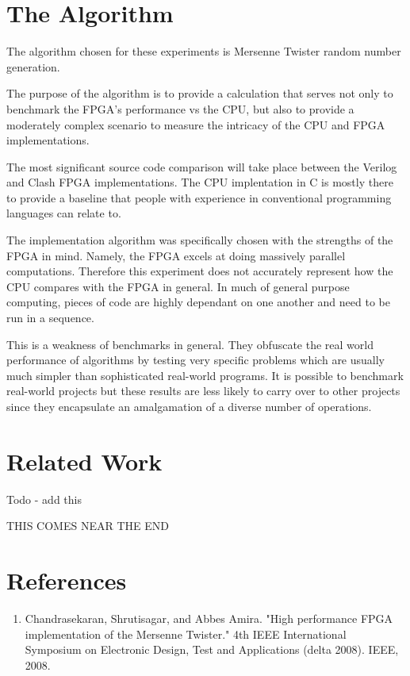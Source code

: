 \documentclass{article}
\begin{document}
\begin{multicols}{2}
    \section{The Algorithm}

    The algorithm chosen for these experiments is Mersenne Twister
    random number generation.

    The purpose of the algorithm is to provide a calculation that serves not only to benchmark
    the FPGA's performance vs the CPU, but also to provide a moderately complex
    scenario to measure the intricacy of the CPU and FPGA implementations.

    The most significant source code comparison will take place between the Verilog and
    Clash FPGA implementations. The CPU implentation in C is mostly there to provide
    a baseline that people with experience in conventional programming languages
    can relate to.

    The implementation algorithm was specifically chosen with the strengths of the FPGA
    in mind. Namely, the FPGA excels at doing massively parallel computations.
    Therefore this experiment does not accurately represent how the CPU compares
    with the FPGA in general. In much of general purpose computing, pieces of code
    are highly dependant on one another and need to be run in a sequence.

    This is a weakness of benchmarks in general. They obfuscate the real world performance
    of algorithms by testing very specific problems which are usually much simpler
    than sophisticated real-world programs. It is possible to benchmark real-world
    projects but these results are less likely to carry over to other projects since
    they encapsulate an amalgamation of a diverse number of operations.
    
    \section{Related Work}

    Todo - add this

    THIS COMES NEAR THE END

    
    \end{multicols}

    \break
    \section*{References}

    \begin{enumerate}

    \item Chandrasekaran, Shrutisagar, and Abbes Amira. "High performance FPGA implementation of the Mersenne Twister." 4th IEEE International Symposium on Electronic Design, Test and Applications (delta 2008). IEEE, 2008.

    \end{enumerate}
    
\end{document}
